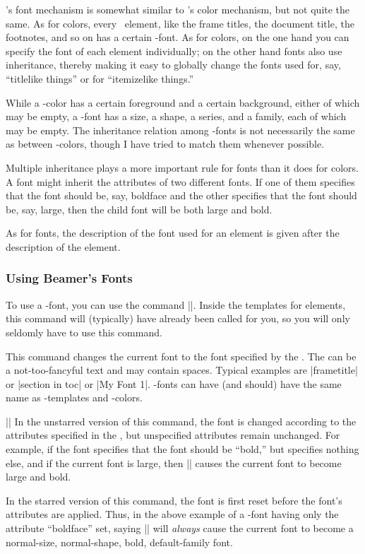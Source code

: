 \beamer's font mechanism is somewhat similar to \beamer's color mechanism, but not quite the same. As for colors, every \beamer\ element, like the frame titles, the document title, the footnotes, and so on has a certain \beamer-font. As for colors, on the one hand you can specify the font of each element individually; on the other hand fonts also use inheritance, thereby making it easy to globally change the fonts used for, say, ``titlelike things'' or for ``itemizelike things.''

While a \beamer-color has a certain foreground and a certain background, either of which may be empty, a \beamer-font has a size, a shape, a series, and a family, each of which may be empty. The inheritance relation among \beamer-fonts is not necessarily the same as between \beamer-colors, though I have tried to match them whenever possible.

Multiple inheritance plays a more important rule for fonts than it does for colors. A font might inherit the attributes of two different fonts. If one of them specifies that the font should be, say, boldface and the other specifies that the font should be, say, large, then the child font will be both large and bold.

As for fonts, the description of the font used for an element is given after the description of the element.


\subsubsection{Using Beamer's Fonts}

To use a \beamer-font, you can use the command |\usebeamerfont|. Inside the templates for elements, this command will (typically) have already been called for you, so you will only seldomly have to use this command.

\begin{command}{\usebeamerfont\opt{|*|}}
  This command changes the current font to the font specified by the . The  can be a not-too-fancyful text and may contain spaces. Typical examples are |frametitle| or |section in toc| or |My Font 1|. \beamer-fonts can have (and should) have the same name as \beamer-templates and \beamer-colors.

  \example ||
  In the unstarred version of this command, the font is changed according to the attributes specified in the , but unspecified attributes remain unchanged. For example, if the font specifies that the font should be ``bold,'' but specifies nothing else, and if the current font is large, then |\usebeamerfont| causes the current font to become large and bold.

  In the starred version of this command, the font is first reset before the font's attributes are applied. Thus, in the above example of a \beamer-font having only the attribute ``boldface'' set, saying |\usebeamerfont*| will \emph{always} cause the current font to become a normal-size, normal-shape, bold, default-family font.
\end{command}


